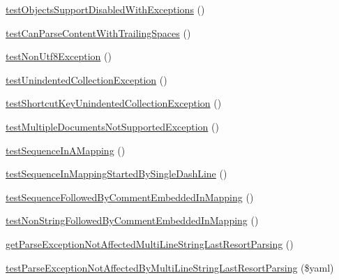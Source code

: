 \begin{DoxyCompactItemize}
\item 
\mbox{\hyperlink{class_symfony_1_1_component_1_1_yaml_1_1_tests_1_1_parser_test_a91b201d287c39ca9be2a84a213f9659e}{test\+Objects\+Support\+Disabled\+With\+Exceptions}} ()
\item 
\mbox{\hyperlink{class_symfony_1_1_component_1_1_yaml_1_1_tests_1_1_parser_test_a38b0c1d41750c6d29424efe9ff1f7589}{test\+Can\+Parse\+Content\+With\+Trailing\+Spaces}} ()
\item 
\mbox{\hyperlink{class_symfony_1_1_component_1_1_yaml_1_1_tests_1_1_parser_test_a0e02d367703ae13e8e7b88dd7f06cc4a}{test\+Non\+Utf8\+Exception}} ()
\item 
\mbox{\hyperlink{class_symfony_1_1_component_1_1_yaml_1_1_tests_1_1_parser_test_aadaf3d83de85b517271407bc54b8ef54}{test\+Unindented\+Collection\+Exception}} ()
\item 
\mbox{\hyperlink{class_symfony_1_1_component_1_1_yaml_1_1_tests_1_1_parser_test_aac3fb84b0309ed68f476f61cadac8642}{test\+Shortcut\+Key\+Unindented\+Collection\+Exception}} ()
\item 
\mbox{\hyperlink{class_symfony_1_1_component_1_1_yaml_1_1_tests_1_1_parser_test_a2e9e13037d52f78099b1afc677b4962e}{test\+Multiple\+Documents\+Not\+Supported\+Exception}} ()
\item 
\mbox{\hyperlink{class_symfony_1_1_component_1_1_yaml_1_1_tests_1_1_parser_test_a9347d26eb72020d8a03fe34c0d311895}{test\+Sequence\+In\+A\+Mapping}} ()
\item 
\mbox{\hyperlink{class_symfony_1_1_component_1_1_yaml_1_1_tests_1_1_parser_test_a81c5f2028fdbb5f42639fbcdb7304831}{test\+Sequence\+In\+Mapping\+Started\+By\+Single\+Dash\+Line}} ()
\item 
\mbox{\hyperlink{class_symfony_1_1_component_1_1_yaml_1_1_tests_1_1_parser_test_a94bb7fc3284a3aaf710415c65da225e8}{test\+Sequence\+Followed\+By\+Comment\+Embedded\+In\+Mapping}} ()
\item 
\mbox{\hyperlink{class_symfony_1_1_component_1_1_yaml_1_1_tests_1_1_parser_test_aa16e7ccc6bfa8b5459737b8d0289abd4}{test\+Non\+String\+Followed\+By\+Comment\+Embedded\+In\+Mapping}} ()
\item 
\mbox{\hyperlink{class_symfony_1_1_component_1_1_yaml_1_1_tests_1_1_parser_test_a2e4673c461bdd711de7cb8baaf4a6ffe}{get\+Parse\+Exception\+Not\+Affected\+Multi\+Line\+String\+Last\+Resort\+Parsing}} ()
\item 
\mbox{\hyperlink{class_symfony_1_1_component_1_1_yaml_1_1_tests_1_1_parser_test_a7f648a605107dc285a5e31201859e25d}{test\+Parse\+Exception\+Not\+Affected\+By\+Multi\+Line\+String\+Last\+Resort\+Parsing}} (\$yaml)

\end{DoxyCompactItemize}
